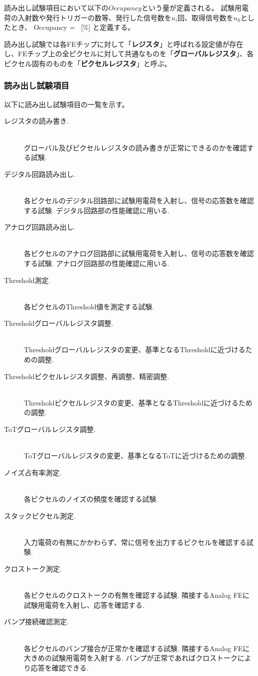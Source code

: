読み出し試験項目において以下の$Occupancy$という量が定義される。
試験用電荷の入射数や発行トリガーの数等、発行した信号数を$n_i$回、取得信号数を$n_0$としたとき、
\bbb
\label{occupancy}
Occupancy =  ~[\%]
\eee
と定義する。

読み出し試験では各FEチップに対して「\textbf{レジスタ}」と呼ばれる設定値が存在し、FEチップ上の全ピクセルに対して共通なものを「\textbf{グローバルレジスタ}」、各ピクセル固有のものを「\textbf{ピクセルレジスタ}」と呼ぶ。

\clearpage
\subsubsection{読み出し試験項目}
以下に読み出し試験項目の一覧を示す。
\begin{description}
  \item[レジスタの読み書き.]\mbox{}\\
グローバル及びピクセルレジスタの読み書きが正常にできるのかを確認する試験.
  \item[デジタル回路読み出し.]\mbox{} \\
各ピクセルのデジタル回路部に試験用電荷を入射し、信号の応答数を確認する試験. デジタル回路部の性能確認に用いる.
  \item[アナログ回路読み出し.]\mbox{}\\
各ピクセルのアナログ回路部に試験用電荷を入射し、信号の応答数を確認する試験. アナログ回路部の性能確認に用いる.
  \item[Threshold測定.]\mbox{}\\
各ピクセルのThreshold値を測定する試験.
  \item[Thresholdグローバルレジスタ調整.]\mbox{}\\
Thresholdグローバルレジスタの変更、基準となるThresholdに近づけるための調整.
  \item[Thresholdピクセルレジスタ調整、再調整、精密調整.]\mbox{}\\
Thresholdピクセルレジスタの変更、基準となるThresholdに近づけるための調整.
  \item[ToTグローバルレジスタ調整.]\mbox{}\\
ToTグローバルレジスタの変更、基準となるToTに近づけるための調整.
  \item[ノイズ占有率測定.]\mbox{}\\
各ピクセルのノイズの頻度を確認する試験.
  \item[スタックピクセル測定.]\mbox{}\\
入力電荷の有無にかかわらず、常に信号を出力するピクセルを確認する試験.
  \item[クロストーク測定.]\mbox{}\\
各ピクセルのクロストークの有無を確認する試験. 隣接するAnalog FEに試験用電荷を入射し、応答を確認する.
  \item[バンプ接続確認測定.]\mbox{}\\
各ピクセルのバンプ接合が正常かを確認する試験. 隣接するAnalog FEに大きめの試験用電荷を入射する. バンプが正常であればクロストークにより応答を確認できる.
\end{description}

